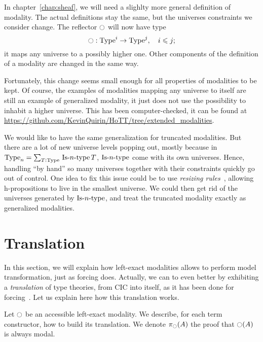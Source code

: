 In chapter~\ref{chap:sheaf}, we will need a slighlty more general
definition of modality. The actual definitions stay the same, but the
universes constraints we consider change. The reflector $\ocircle$ will
now have type
\[ \ocircle : \operatorname{Type}^i \to \operatorname{Type}^j,\quad i \leqslant j ;\]
it maps any universe to a possibly higher one.
Other components of the definition of a modality are changed in the
same way. 

Fortunately, this change seems small enough for all properties of
modalities to be kept. Of course, the examples of modalities mapping
any universe to itself are still an example of generalized modality,
it just does not use the possibility to inhabit a higher
universe. This has been computer-checked, it can be found at 
\url{https://github.com/KevinQuirin/HoTT/tree/extended_modalities}.

We would like to have the same generalization for truncated
modalities. But there are a lot of new universe levels popping out,
mostly because in $\operatorname{Type}_n = \sum_{T:\operatorname{Type}}\, \mathop{\mathrm{Is{\hbox{-}}}n\mathrm{{\hbox{-}} type}} T$, $\mathop{\mathrm{Is{\hbox{-}}}n\mathrm{{\hbox{-}} type}}$
come with its own universes. Hence, handling ``by hand'' so many
universes together with their constraints quickly go out of
control. One idea to fix this issue could be to use {\em resizing
  rules}~\cite{vv-resizing}, allowing h-propositions to live in the
smallest universe. We could then get rid of the universes generated by
$\mathop{\mathrm{Is{\hbox{-}}}n\mathrm{{\hbox{-}} type}}$, and treat the truncated modality exactly as generalized
modalities.







\section{Translation}
\label{sec:translation}

In this section, we will explain how left-exact modalities allows to
perform model transformation, just as forcing does.  Actually, we can
to even better by exhibiting a {\em translation} of type theories,
from CIC into itself, as it has been done for
forcing~\cite{jaber2012extending,forcing2016}. Let us explain here how
this translation works.

Let $\ocircle$ be an accessible left-exact modality. We describe, for each term
constructor, how to build its translation. We denote $\pi_{\ocircle}(A)$
the proof that $\ocircle(A)$ is always modal.

